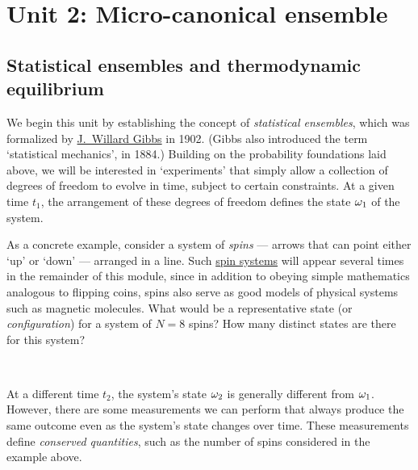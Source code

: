 \renewcommand{\thisunit}{MATH327 Unit 2}
\renewcommand{\moddate}{Last modified 2 Feb.~2025}
\setcounter{section}{2}
\setcounter{subsection}{0}
{}
\section*{Unit 2: Micro-canonical ensemble}
\subsection{\label{sec:ensemble}Statistical ensembles and thermodynamic equilibrium}
We begin this unit by establishing the concept of \textit{statistical ensembles}, which was formalized by \href{https://en.wikipedia.org/wiki/Josiah_Willard_Gibbs}{J.\ Willard Gibbs} in 1902. %
(Gibbs also introduced the term `statistical mechanics', in 1884.)
Building on the probability foundations laid above, we will be interested in `experiments' that simply allow a collection of degrees of freedom to evolve in time, subject to certain constraints.
At a given time $t_1$, the arrangement of these degrees of freedom defines the state $\omega_1$ of the system.

As a concrete example, consider a system of \textit{spins} --- arrows that can point either `up' or `down' --- arranged in a line.
Such \href{https://en.wikipedia.org/wiki/Spin_model}{spin systems} will appear several times in the remainder of this module, since in addition to obeying simple mathematics analogous to flipping coins, spins also serve as good models of physical systems such as magnetic molecules.
What would be a representative state (or \textit{configuration}) for a system of $N = 8$ spins?
How many distinct states are there for this system?
\begin{mdframed}
  \ \\[80 pt]
\end{mdframed}

At a different time $t_2$, the system's state $\omega_2$ is generally different from $\omega_1$.
However, there are some measurements we can perform that always produce the same outcome even as the system's state changes over time.
These measurements define \textit{conserved quantities}, such as the number of spins considered in the example above.

